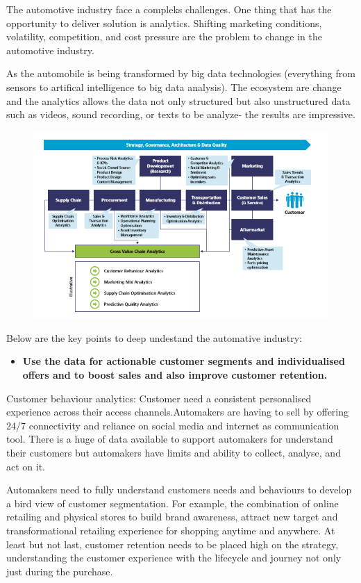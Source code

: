 \documentclass[]{book}
\providecommand{\tightlist}{%
  \setlength{\itemsep}{0pt}\setlength{\parskip}{0pt}}
\begin{document}
The automotive industry face a compleks challenges. One thing that has
the opportunity to deliver solution is analytics. Shifting marketing
conditions, volatility, competition, and cost pressure are the problem
to change in the automotive industry.

As the automobile is being transformed by big data technologies
(everything from sensors to artifical intelligence to big data
analysis). The ecosystem are change and the analytics allows the data
not only structured but also unstructured data such as videos, sound
recording, or texts to be analyze- the results are impressive.

\begin{figure}
\centering
\includegraphics{15.png}
\caption{}
\end{figure}

Below are the key points to deep undestand the automative industry:

\begin{itemize}
\tightlist
\item
  \textbf{Use the data for actionable customer segments and
  individualised offers and to boost sales and also improve customer
  retention.}
\end{itemize}

Customer behaviour analytics: Customer need a consistent personalised
experience across their access channels.Automakers are having to sell by
offering 24/7 connectivity and reliance on social media and internet as
communication tool. There is a huge of data available to support
automakers for understand their customers but automakers have limits and
ability to collect, analyse, and act on it.

Automakers need to fully understand customers needs and behaviours to
develop a bird view of customer segmentation. For example, the
combination of online retailing and physical stores to build brand
awareness, attract new target and transformational retailing experience
for shopping anytime and anywhere. At least but not last, customer
retention needs to be placed high on the strategy, understanding the
customer experience with the lifecycle and journey not only just during
the purchase.
\end{document}
